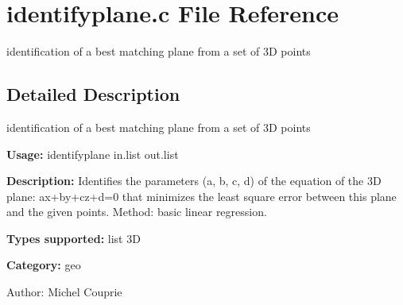 \section{identifyplane.c File Reference}
\label{identifyplane_8c}
identification of a best matching plane from a set of 3D points 



\subsection{Detailed Description}
identification of a best matching plane from a set of 3D points 

{\bf Usage:} identifyplane in.list out.list

{\bf Description:} Identifies the parameters (a, b, c, d) of the equation of the 3D plane: ax+by+cz+d=0 that minimizes the least square error between this plane and the given points. Method: basic linear regression.

{\bf Types supported:} list 3D

{\bf Category:} geo

\begin{Desc}
\item[Author:]Michel Couprie \end{Desc}
